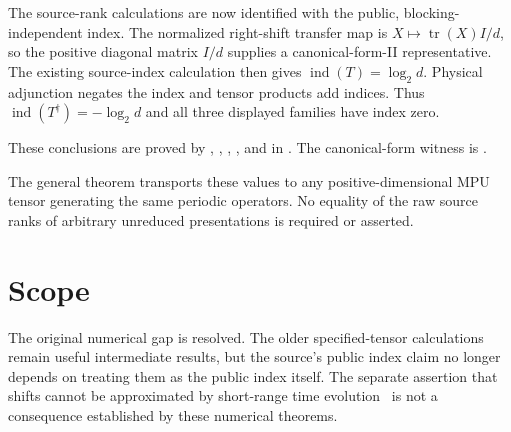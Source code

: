 \documentclass{article}
\begin{document}
The source-rank calculations are now identified with the public,
blocking-independent index. The normalized right-shift transfer map is
$X\mapsto\operatorname{tr}(X)I/d$, so the positive diagonal matrix $I/d$
supplies a canonical-form-II representative. The existing source-index
calculation then gives $\operatorname{ind}(T)=\log_2 d$.
Physical adjunction negates the index and tensor products add indices.
Thus $\operatorname{ind}(T^\dagger)=-\log_2 d$ and all three displayed
families have index zero.

These conclusions are proved by
,
,
,
, and
 in
.
The canonical-form witness is
.

The general theorem  transports
these values to any positive-dimensional MPU tensor generating the same
periodic operators. No equality of the raw source ranks of arbitrary
unreduced presentations is required or asserted.

\section{Scope}

The original numerical gap is resolved. The older specified-tensor
calculations remain useful intermediate results, but the source's public
index claim no longer depends on treating them as the public index itself.
The separate assertion that shifts cannot be approximated by short-range
time evolution~\cite{Cirac2021Matrix} is not a consequence established by
these numerical theorems.



\end{document}
